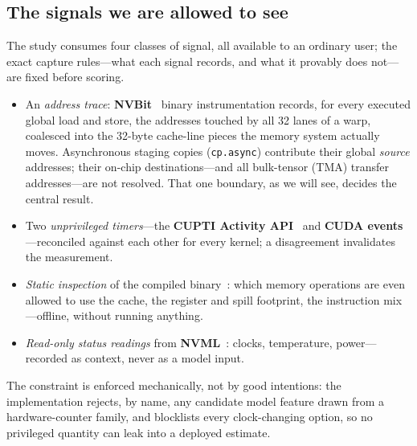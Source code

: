 \documentclass[conference]{IEEEtran}
\begin{document}
\subsection{The signals we are allowed to see}
\label{sec:signals}
The study consumes four classes of signal, all available to an ordinary
user; the exact capture rules---what each signal records, and what it
provably does not---are fixed before scoring.
\begin{itemize}
\item An \emph{address trace}: \textbf{NVBit}~\cite{villa2019nvbit} binary
instrumentation records, for every executed global load and store, the
addresses touched by all 32 lanes of a warp, coalesced into the 32-byte
cache-line pieces the memory system actually moves. Asynchronous staging copies
(\texttt{cp.async}) contribute their global \emph{source} addresses; their
on-chip destinations---and all bulk-tensor (TMA) transfer addresses---are
not resolved. That one boundary, as we will see, decides the central result.
\item Two \emph{unprivileged timers}---the \textbf{CUPTI Activity
API}~\cite{nvidia_cupti_activity} and \textbf{CUDA events}---reconciled
against each other for every kernel; a disagreement invalidates the measurement.
\item \emph{Static inspection} of the compiled binary~\cite{nvidia_cudabinutils}:
which memory operations are even allowed to use the cache, the register and
spill footprint, the instruction mix---offline, without running anything.
\item \emph{Read-only status readings} from \textbf{NVML}~\cite{nvidia_nvml}:
clocks, temperature, power---recorded as context, never as a model input.
\end{itemize}
The constraint is enforced mechanically, not by good intentions: the implementation
rejects, by name, any candidate model feature drawn from a hardware-counter
family, and blocklists every clock-changing option, so no privileged quantity
can leak into a deployed estimate.
\end{document}
